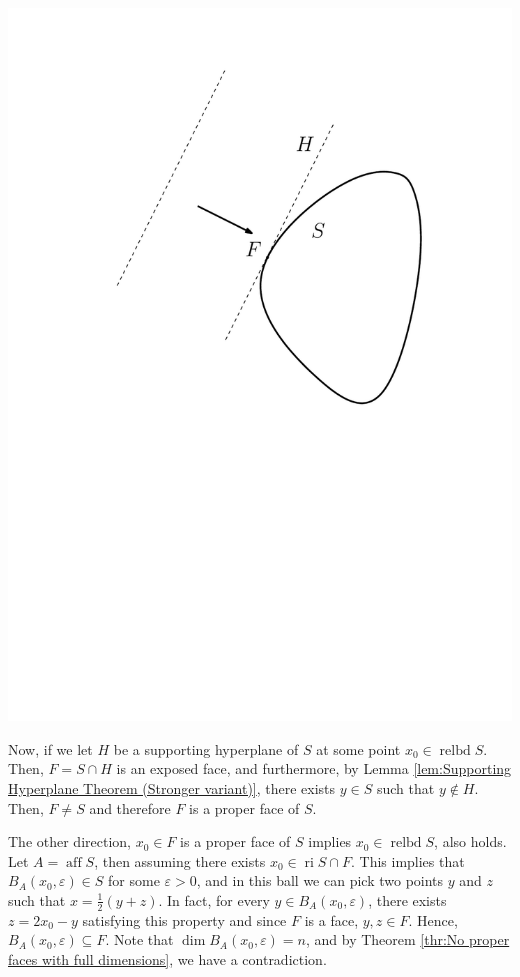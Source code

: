 \includegraphics[scale=0.5]{figures/1696891724}

Now, if we let \( H \) be a supporting hyperplane of \( S \) at some point
\( x_{0} \in \operatorname{relbd} S \). Then, \( F = S \cap H \) is an exposed
face, and furthermore, by Lemma \ref{lem:Supporting Hyperplane Theorem (Stronger
variant)}, there exists \( y \in S \) such that \( y \notin H \). Then, \( F
\neq  S \) and therefore \( F \) is a proper face of \( S \).

The other direction, \( x_{0} \in F \) is a proper face of \( S \) implies \(
x_{0} \in \operatorname{relbd} S \), also holds. Let \( A = \operatorname{aff} S
\), then assuming there exists \( x_{0} \in \operatorname{ri } S \cap F \). This
implies that \( B_{A}(x_{0}, \varepsilon) \in S \) for some \( \varepsilon > 0
\), and in this ball we can pick two points \( y \) and \( z \) such that \( x =
\frac{1}{2}(y + z) \). In fact, for every \( y \in B_{A}(x_{0}, \varepsilon) \),
there exists \( z = 2x_{0} - y \) satisfying this property and since \( F \) is a
face, \( y, z \in F \). Hence, \( B_{A}(x_{0}, \varepsilon) \subseteq F \).
Note that \( \dim B_{A}(x_{0}, \varepsilon) = n \), and by Theorem
\ref{thr:No proper faces with full dimensions}, we have a contradiction.

